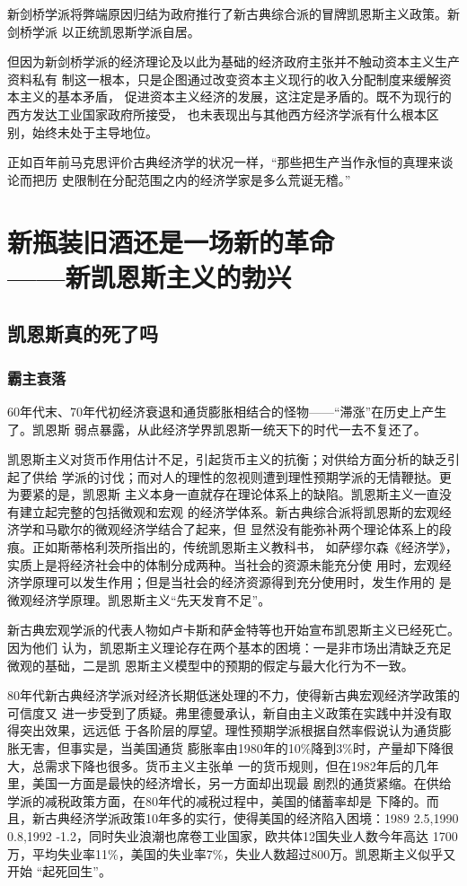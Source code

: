 新剑桥学派将弊端原因归结为政府推行了新古典综合派的冒牌凯恩斯主义政策。新剑桥学派
以正统凯恩斯学派自居。

但因为新剑桥学派的经济理论及以此为基础的经济政府主张并不触动资本主义生产资料私有
制这一根本，只是企图通过改变资本主义现行的收入分配制度来缓解资本主义的基本矛盾，
促进资本主义经济的发展，这注定是矛盾的。既不为现行的西方发达工业国家政府所接受，
也未表现出与其他西方经济学派有什么根本区别，始终未处于主导地位。

正如百年前马克思评价古典经济学的状况一样，“那些把生产当作永恒的真理来谈论而把历
史限制在分配范围之内的经济学家是多么荒诞无稽。”

\chapter{新瓶装旧酒还是一场新的革命\\ ——新凯恩斯主义的勃兴}

\section{凯恩斯真的死了吗}

\subsection{霸主衰落}

60年代末、70年代初经济衰退和通货膨胀相结合的怪物——“滞涨”在历史上产生了。凯恩斯
弱点暴露，从此经济学界凯恩斯一统天下的时代一去不复还了。

凯恩斯主义对货币作用估计不足，引起货币主义的抗衡；对供给方面分析的缺乏引起了供给
学派的讨伐；而对人的理性的忽视则遭到理性预期学派的无情鞭挞。更为要紧的是，凯恩斯
主义本身一直就存在理论体系上的缺陷。凯恩斯主义一直没有建立起完整的包括微观和宏观
的经济学体系。新古典综合派将凯恩斯的宏观经济学和马歇尔的微观经济学结合了起来，但
显然没有能弥补两个理论体系上的段痕。正如斯蒂格利茨所指出的，传统凯恩斯主义教科书，
如萨缪尔森《经济学》，实质上是将经济社会中的体制分成两种。当社会的资源未能充分使
用时，宏观经济学原理可以发生作用；但是当社会的经济资源得到充分使用时，发生作用的
是微观经济学原理。凯恩斯主义“先天发育不足”。

新古典宏观学派的代表人物如卢卡斯和萨金特等也开始宣布凯恩斯主义已经死亡。因为他们
认为，凯恩斯主义理论存在两个基本的困境：一是非市场出清缺乏充足微观的基础，二是凯
恩斯主义模型中的预期的假定与最大化行为不一致。

80年代新古典经济学派对经济长期低迷处理的不力，使得新古典宏观经济学政策的可信度又
进一步受到了质疑。弗里德曼承认，新自由主义政策在实践中并没有取得突出效果，远远低
于各阶层的厚望。理性预期学派根据自然率假说认为通货膨胀无害，但事实是，当美国通货
膨胀率由1980年的10\%降到3\%时，产量却下降很大，总需求下降也很多。货币主义主张单
一的货币规则，但在1982年后的几年里，美国一方面是最快的经济增长，另一方面却出现最
剧烈的通货紧缩。在供给学派的减税政策方面，在80年代的减税过程中，美国的储蓄率却是
下降的。而且，新古典经济学派政策10年多的实行，使得美国的经济陷入困境：1989
2.5,1990 0.8,1992 -1.2，同时失业浪潮也席卷工业国家，欧共体12国失业人数今年高达
1700万，平均失业率11\%，美国的失业率7\%，失业人数超过800万。凯恩斯主义似乎又开始
“起死回生”。

